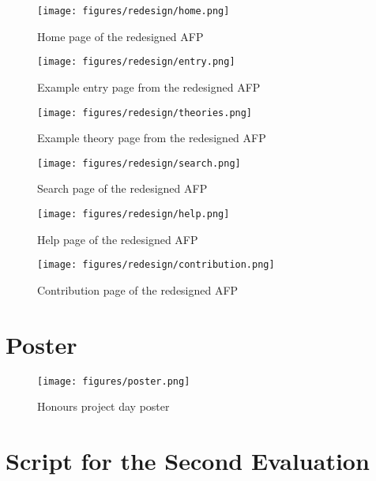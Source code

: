 \documentclass[bsc,frontabs,oneside,singlespacing,parskip,deptreport,logo]{infthesis}
\begin{document}
\begin{figure}[h]
    \centering
    \texttt{[image: figures/redesign/home.png]}
    \caption{Home page of the redesigned AFP}

\end{figure}

\begin{figure}[h]
    \centering
    \texttt{[image: figures/redesign/entry.png]}
    \caption{Example entry page from the redesigned AFP}

\end{figure}

\begin{figure}[h]
    \centering
    \texttt{[image: figures/redesign/theories.png]}
    \caption{Example theory page from the redesigned AFP}

\end{figure}

\begin{figure}[h]
    \centering
    \texttt{[image: figures/redesign/search.png]}
    \caption{Search page of the redesigned AFP}

\end{figure}

\begin{figure}[h]
    \centering
    \texttt{[image: figures/redesign/help.png]}
    \caption{Help page of the redesigned AFP}

\end{figure}

\begin{figure}[h]
    \centering
    \texttt{[image: figures/redesign/contribution.png]}
    \caption{Contribution page of the redesigned AFP}
\end{figure}

\chapter{Poster} \label{poster}

\begin{figure}[h]
    \centering
    \texttt{[image: figures/poster.png]}
    \caption{Honours project day poster}
\end{figure}

\chapter{Script for the Second Evaluation} \label{eval-script}
\end{document}
